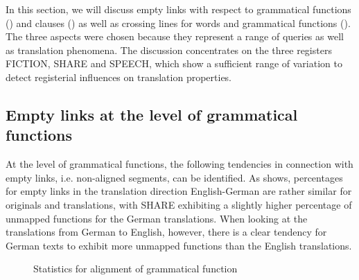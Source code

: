 \documentclass[output=paper]{LSP/langsci}
\begin{document}
In this section, we will discuss empty links with respect to grammatical functions () and clauses () as well as crossing lines for words and grammatical functions (). The three aspects were chosen because they represent a range of queries as well as translation phenomena. The discussion concentrates on the three registers FICTION, SHARE and SPEECH, which show a sufficient range of variation to detect registerial influences on translation properties. 

\subsection{Empty links at the level of grammatical functions}\label{sec:culo:4.1}

At the level of grammatical functions, the following tendencies in connection with empty links, i.e. non-aligned segments, can be identified. As  shows, percentages for empty links in the translation direction English-German are rather similar for originals and translations, with SHARE exhibiting a slightly higher percentage of unmapped functions for the German translations. When looking at the translations from German to English, however, there is a clear tendency for German texts to exhibit more unmapped functions than the English translations. 

\begin{figure}

\caption{Statistics for alignment of grammatical function}
\label{fig:culo:grammaticalfunction}
\end{figure}
\end{document}
